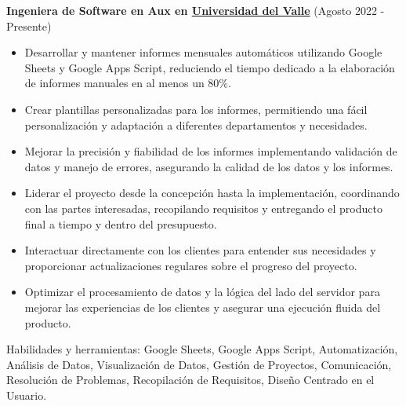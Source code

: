 \vspace*{0.2cm}
\textbf{Ingeniera de Software en Aux en \href{https://www.univalle.edu.co/}{Universidad del Valle}} (Agosto 2022 - Presente)
\hfill
\vspace*{0.2cm}
\begin{minipage}{\linewidth}
\begin{itemize}[noitemsep]
    \item Desarrollar y mantener informes mensuales automáticos utilizando Google Sheets y Google Apps Script, reduciendo el tiempo dedicado a la elaboración de informes manuales en al menos un 80\%.
    \item Crear plantillas personalizadas para los informes, permitiendo una fácil personalización y adaptación a diferentes departamentos y necesidades.
    \item Mejorar la precisión y fiabilidad de los informes implementando validación de datos y manejo de errores, asegurando la calidad de los datos y los informes.
    \item Liderar el proyecto desde la concepción hasta la implementación, coordinando con las partes interesadas, recopilando requisitos y entregando el producto final a tiempo y dentro del presupuesto.
    \item Interactuar directamente con los clientes para entender sus necesidades y proporcionar actualizaciones regulares sobre el progreso del proyecto.
    \item Optimizar el procesamiento de datos y la lógica del lado del servidor para mejorar las experiencias de los clientes y asegurar una ejecución fluida del producto.
\end{itemize}
\hfill
\end{minipage}
Habilidades y herramientas: Google Sheets, Google Apps Script, Automatización, Análisis de Datos, Visualización de Datos, Gestión de Proyectos, Comunicación, Resolución de Problemas, Recopilación de Requisitos, Diseño Centrado en el Usuario.

\newpage

